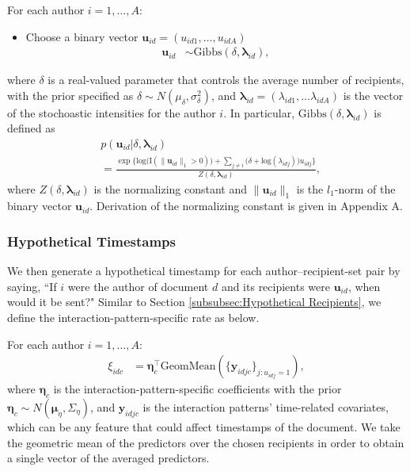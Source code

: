 \documentclass[twoside]{article}
\begin{document}
For each author $i =1,\ldots,A$:
\begin{itemize}
	\item Choose a binary vector $\boldsymbol{u}_{id}= (u_{id1},
	\ldots, u_{idA})$
\begin{align*} \boldsymbol{u}_{id} & \sim
\mbox{Gibbs}(\delta, \boldsymbol{\lambda}_{id}),
\end{align*}
\end{itemize}
	where $\delta$ is a real-valued parameter that controls the average number of recipients, with the prior specified as $\delta \sim N(\mu_\delta,\sigma^2_\delta)$, and $\boldsymbol{\lambda}_{id}=(\lambda_{id1},\ldots\lambda_{idA})$ is the vector of the stochoastic intensities for the author $i$. In particular, $\mbox{Gibbs}(\delta, \boldsymbol{\lambda}_{id})$ is defined as
	\begin{align*}
	&p(\boldsymbol{u}_{id}|\delta, \boldsymbol{\lambda}_{id}) \\&= \frac{\exp\Big\{\mbox{log}\Big(\text{I}( \lVert \boldsymbol{u}_{id}\rVert_1 > 0 )\Big) + \sum_{j \neq i} \Big(\delta+\mbox{log}(\lambda_{idj})\Big)u_{idj}\Big\}}{Z(\delta,\boldsymbol{\lambda}_{id})} ,
	\end{align*}
where $Z(\delta,\boldsymbol{\lambda}_{id})$ is the normalizing constant and $\lVert \boldsymbol{u}_{id}\rVert_1$ is the $l_1$-norm of the binary vector $\boldsymbol{u}_{id}$. Derivation of the normalizing constant is given in Appendix A. 

\subsubsection{Hypothetical Timestamps}\label{subsubsec:Hypothetical Timestamps}
We then generate a hypothetical timestamp for each author--recipient-set pair by saying, ``If $i$ were the author of document $d$ and its recipients were $\boldsymbol{u}_{id}$, when would it be sent?" Similar to Section \ref{subsubsec:Hypothetical Recipients}, we define the interaction-pattern-specific rate as below.

For each author $i =1,\ldots,A$:
\begin{align*}
\xi_{idc}& = \boldsymbol{\eta}_c^\top\mbox{GeomMean}(\{ \boldsymbol{y}_{idjc}\}_{j:u_{idj}= 1}),
\end{align*}
where $\boldsymbol{\eta}_c$ is the interaction-pattern-specific coefficients with the prior $\boldsymbol{\eta}_c \sim N(\boldsymbol{\mu}_\eta,\Sigma_\eta)$, and $\boldsymbol{y}_{idjc}$ is the interaction patterns' time-related covariates, which can be any feature that could affect timestamps of the document. We take the geometric mean of the predictors over the chosen recipients in order to obtain a single vector of the averaged predictors. 
\end{document}
